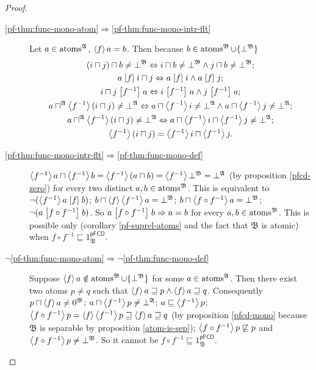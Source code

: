 \begin{proof}
~
\begin{description}
\item [{\ref{pf-thm:func-mono-atom}$\Rightarrow$\ref{pf-thm:func-mono-intr-flt}}] Let
$a\in\operatorname{atoms}^{\mathfrak{A}}$, $\left\langle f\right\rangle a=b$. Then because $b\in\operatorname{atoms}^{\mathfrak{B}}\cup\{\bot^{\mathfrak{B}}\}$
\begin{gather*}
(i\sqcap j)\sqcap b\ne\bot^{\mathfrak{B}}\Leftrightarrow i\sqcap b\ne\bot^{\mathfrak{B}}\land j\sqcap b\ne\bot^{\mathfrak{B}};\\
a\mathrel{\left[f\right]}i\sqcap j\Leftrightarrow a\mathrel{\left[f\right]}i\land a\mathrel{\left[f\right]}j;\\
i\sqcap j\mathrel{\left[f^{-1}\right]}a\Leftrightarrow i\mathrel{\left[f^{-1}\right]}a\land j\mathrel{\left[f^{-1}\right]}a;\\
a\sqcap^{\mathfrak{A}}\left\langle f^{-1}\right\rangle(i\sqcap j)\ne\bot^{\mathfrak{A}}\Leftrightarrow a\sqcap\left\langle f^{-1}\right\rangle i\ne\bot^{\mathfrak{A}}\land a\sqcap\left\langle f^{-1}\right\rangle j\ne\bot^{\mathfrak{A}};\\
a\sqcap^{\mathfrak{A}}\left\langle f^{-1}\right\rangle(i\sqcap j)\ne\bot^{\mathfrak{A}}\Leftrightarrow a\sqcap\left\langle f^{-1}\right\rangle i\sqcap\left\langle f^{-1}\right\rangle j\ne\bot^{\mathfrak{A}};\\
\left\langle f^{-1}\right\rangle(i\sqcap j)=\left\langle f^{-1}\right\rangle i\sqcap\left\langle f^{-1}\right\rangle j.
\end{gather*}

\item [{\ref{pf-thm:func-mono-intr-flt}$\Rightarrow$\ref{pf-thm:func-mono-def}}] $\left\langle f^{-1}\right\rangle a\sqcap\left\langle f^{-1}\right\rangle b=\left\langle f^{-1}\right\rangle(a\sqcap b)=\left\langle f^{-1}\right\rangle\bot^{\mathfrak{B}}=\bot^{\mathfrak{A}}$
(by proposition \ref{pfcd-zero})
for every two distinct $a,b\in\operatorname{atoms}^{\mathfrak{B}}$. This is equivalent
to $\lnot(\left\langle f^{-1}\right\rangle a\mathrel{\left[f\right]}b)$; $b\sqcap\left\langle f\right\rangle\left\langle f^{-1}\right\rangle a=\bot^{\mathfrak{B}}$;
$b\sqcap\left\langle f\circ f^{-1}\right\rangle a=\bot^{\mathfrak{B}}$; $\lnot(a\mathrel{\left[f\circ f^{-1}\right]}b)$.
So $a\mathrel{\left[f\circ f^{-1}\right]}b\Rightarrow a=b$ for every $a,b\in\operatorname{atoms}^{\mathfrak{B}}$.
This is possible only (corollary \ref{pf-suprel-atoms} and the fact
that $\mathfrak{B}$ is atomic) when $f\circ f^{-1}\sqsubseteq1_{\mathfrak{B}}^{\mathsf{pFCD}}$.
\item [{$\neg$\ref{pf-thm:func-mono-atom}$\Rightarrow\neg$\ref{pf-thm:func-mono-def}}] Suppose
$\left\langle f\right\rangle a\notin\operatorname{atoms}^{\mathfrak{B}}\cup\{\bot^{\mathfrak{B}}\}$
for some $a\in\operatorname{atoms}^{\mathfrak{A}}$. Then there exist two atoms
$p\neq q$ such that $\left\langle f\right\rangle a\sqsupseteq p\wedge\left\langle f\right\rangle a\sqsupseteq q$.
Consequently $p\sqcap\left\langle f\right\rangle a\neq0^{\mathfrak{B}}$; $a\sqcap\left\langle f^{-1}\right\rangle p\ne\bot^{\mathfrak{A}}$;
$a\sqsubseteq\left\langle f^{-1}\right\rangle p$; $\left\langle f\circ f^{-1}\right\rangle p=\left\langle f\right\rangle\left\langle f^{-1}\right\rangle p\sqsupseteq\left\langle f\right\rangle a\sqsupseteq q$
(by proposition \ref{pfcd-mono} because $\mathfrak{B}$ is separable
by proposition \ref{atom-is-sep});
$\left\langle f\circ f^{-1}\right\rangle p\not\sqsubseteq p$ and $\left\langle f\circ f^{-1}\right\rangle p\ne\bot^{\mathfrak{B}}$.
So it cannot be $f\circ f^{-1}\sqsubseteq1_{\mathfrak{B}}^{\mathsf{pFCD}}$.
\end{description}
\end{proof}
